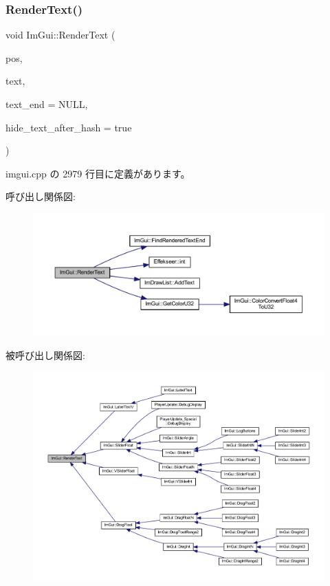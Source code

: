 \subsubsection{\texorpdfstring{Render\+Text()}{RenderText()}}
{\footnotesize\ttfamily void Im\+Gui\+::\+Render\+Text (\begin{DoxyParamCaption}\item[{\mbox{\hyperlink{struct_im_vec2}{Im\+Vec2}}}]{pos,  }\item[{const char $\ast$}]{text,  }\item[{const char $\ast$}]{text\+\_\+end = {\ttfamily NULL},  }\item[{bool}]{hide\+\_\+text\+\_\+after\+\_\+hash = {\ttfamily true} }\end{DoxyParamCaption})}



 imgui.\+cpp の 2979 行目に定義があります。

呼び出し関係図\+:\nopagebreak
\begin{figure}[H]
\begin{center}
\leavevmode
\includegraphics[width=350pt]{namespace_im_gui_a9971ce57f2a288ac3a12df886c5550d1_cgraph}
\end{center}
\end{figure}
被呼び出し関係図\+:\nopagebreak
\begin{figure}[H]
\begin{center}
\leavevmode
\includegraphics[width=350pt]{namespace_im_gui_a9971ce57f2a288ac3a12df886c5550d1_icgraph}
\end{center}
\end{figure}
\mbox{\label{namespace_im_gui_ab362eafae794c7364a6b96ea06f38eb9}} 
